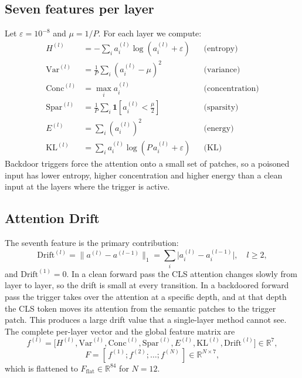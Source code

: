 \documentclass[journal]{IEEEtran}
\begin{document}
\subsection{Seven features per layer}
Let $\varepsilon=10^{-8}$ and $\mu=1/P$. For each layer we compute:
\begin{align}
H^{(l)}&=-\textstyle\sum_i a^{(l)}_i\log(a^{(l)}_i+\varepsilon) && \text{(entropy)}\\
\mathrm{Var}^{(l)}&=\tfrac{1}{P}\textstyle\sum_i (a^{(l)}_i-\mu)^2 && \text{(variance)}\\
\mathrm{Conc}^{(l)}&=\max_i a^{(l)}_i && \text{(concentration)}\\
\mathrm{Spar}^{(l)}&=\tfrac{1}{P}\textstyle\sum_i \mathbf{1}\!\left[a^{(l)}_i<\tfrac{\mu}{2}\right] && \text{(sparsity)}\\
E^{(l)}&=\textstyle\sum_i (a^{(l)}_i)^2 && \text{(energy)}\\
\mathrm{KL}^{(l)}&=\textstyle\sum_i a^{(l)}_i\log(P\,a^{(l)}_i+\varepsilon) && \text{(KL)}
\end{align}
Backdoor triggers force the attention onto a small set of patches, so a poisoned
input has lower entropy, higher concentration and higher energy than a clean
input at the layers where the trigger is active.

\subsection{Attention Drift}
The seventh feature is the primary contribution:
\begin{equation}
\mathrm{Drift}^{(l)}=\big\|a^{(l)}-a^{(l-1)}\big\|_1=\textstyle\sum_i\big|a^{(l)}_i-a^{(l-1)}_i\big|,\quad l\ge2,
\end{equation}
and $\mathrm{Drift}^{(1)}=0$. In a clean forward pass the CLS attention changes
slowly from layer to layer, so the drift is small at every transition. In a
backdoored forward pass the trigger takes over the attention at a specific
depth, and at that depth the CLS token moves its attention from the semantic
patches to the trigger patch. This produces a large drift value that a
single-layer method cannot see. The complete per-layer vector and the global
feature matrix are
\begin{equation}
f^{(l)}=\big[H^{(l)},\mathrm{Var}^{(l)},\mathrm{Conc}^{(l)},\mathrm{Spar}^{(l)},E^{(l)},\mathrm{KL}^{(l)},\mathrm{Drift}^{(l)}\big]\in\mathbb{R}^{7},
\end{equation}
\begin{equation}
F=[\,f^{(1)};f^{(2)};\dots;f^{(N)}\,]\in\mathbb{R}^{N\times7},
\end{equation}
which is flattened to $F_{\mathrm{flat}}\in\mathbb{R}^{84}$ for $N=12$.
\end{document}
